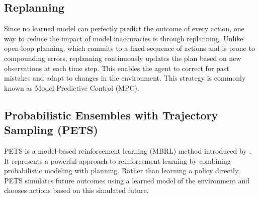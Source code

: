 \subsection{Replanning}
Since no learned model can perfectly predict the outcome of every action, one way to reduce the impact of model inaccuracies is 
through replanning. Unlike open-loop planning, which commits to a fixed sequence of actions and is prone to compounding errors, 
replanning continuously updates the plan based on new observations at each time step. This enables the agent to correct for past 
mistakes and adapt to changes in the environment. This strategy is commonly known as Model Predictive Control (MPC).

\subsection{Probabilistic Ensembles with Trajectory Sampling (PETS)}
PETS is a model-based reinforcement learning (MBRL) method introduced by \cite{chua2018deepreinforcementlearninghandful}. It 
represents a powerful approach to reinforcement learning by combining probabilistic modeling with planning. Rather than learning 
a policy directly, PETS simulates future outcomes using a learned model of the environment and chooses actions based on this 
simulated future.

